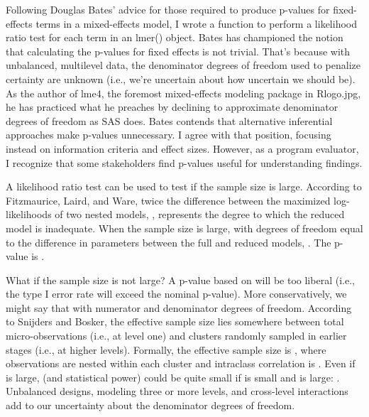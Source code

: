 Following Douglas Bates' advice for those required to produce p-values for fixed-effects terms in a mixed-effects model, I wrote a function to perform a likelihood ratio test for each term in an lmer() object. Bates has championed the notion that calculating the p-values for fixed effects is not trivial. That's because with unbalanced, multilevel data, the denominator degrees of freedom used to penalize certainty are unknown (i.e., we're uncertain about how uncertain we should be). As the author of lme4, the foremost mixed-effects modeling package in Rlogo.jpg, he has practiced what he preaches by declining to approximate denominator degrees of freedom as SAS does. Bates contends that alternative inferential approaches make p-values unnecessary. I agree with that position, focusing instead on information criteria and effect sizes. However, as a program evaluator, I recognize that some stakeholders find p-values useful for understanding findings.

A likelihood ratio test can be used to test  if the sample size is large. According to Fitzmaurice, Laird, and Ware, twice the difference between the maximized log-likelihoods of two nested models, , represents the degree to which the reduced model is inadequate. When the sample size is large,  with degrees of freedom equal to the difference in parameters between the full and reduced models, . The p-value is .

What if the sample size is not large? A p-value based on  will be too liberal (i.e., the type I error rate will exceed the nominal p-value). More conservatively, we might say that  with  numerator and  denominator degrees of freedom. According to Snijders and Bosker, the effective sample size lies somewhere between  total micro-observations (i.e., at level one) and  clusters randomly sampled in earlier stages (i.e., at higher levels). Formally, the effective sample size is , where  observations are nested within each cluster and intraclass correlation is . Even if  is large,  (and statistical power) could be quite small if  is small and  is large: . Unbalanced designs, modeling three or more levels, and cross-level interactions add to our uncertainty about the denominator degrees of freedom.

